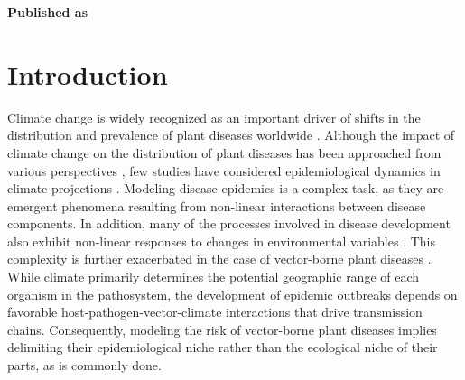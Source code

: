 \vspace{3cm}





\textbf{Published as}

\vspace{0.5cm}


\newpage
\section{Introduction}

Climate change is widely recognized as an important driver of shifts in the
distribution and prevalence of plant diseases worldwide
\cite{Harvell2002, Delgado-Baquerizo2020,  Rocklov2020, Dudney2021,
    Chaloner2021, Singh2023}. Although the impact of climate change on the
distribution of plant diseases has been approached from various perspectives
\cite{bergot2004simulation,pangga2011pathogen}, few studies have considered
epidemiological dynamics in climate projections
\cite{bebber2019climate,Juroszek2015}. Modeling disease epidemics is a complex
task, as they are emergent phenomena resulting from non-linear interactions
between disease components. In addition, many of the processes involved in
disease development also exhibit non-linear responses to changes in
environmental variables \cite{Scherm1994,garrett2011complexity}. This
complexity is further exacerbated in the case of vector-borne plant diseases
\cite{Jeger2019}. While climate primarily determines the potential
geographic range of each organism in the pathosystem, the development of
epidemic outbreaks depends on favorable host-pathogen-vector-climate
interactions that drive transmission chains. Consequently, modeling the risk of
vector-borne plant diseases implies delimiting their epidemiological niche
rather than the ecological niche of their parts, as is commonly done.


